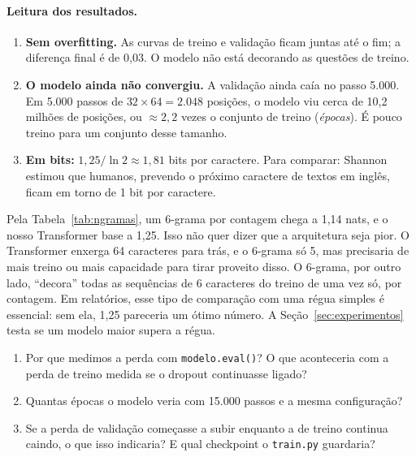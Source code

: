 \documentclass[11pt,a4paper]{article}
\begin{document}
\paragraph{Leitura dos resultados.}
\begin{enumerate}
\item \textbf{Sem overfitting.} As curvas de treino e validação ficam juntas até o fim; a diferença final é de 0,03. O modelo não está decorando as questões de treino.
\item \textbf{O modelo ainda não convergiu.} A validação ainda caía no passo 5.000. Em 5.000 passos de $32\times 64 = 2.048$ posições, o modelo viu cerca de 10,2 milhões de posições, ou $\approx 2{,}2$ vezes o conjunto de treino (\emph{épocas}). É pouco treino para um conjunto desse tamanho.
\item \textbf{Em bits:} $1{,}25/\ln 2 \approx 1{,}81$ bits por caractere. Para comparar: Shannon \cite{shannon1951} estimou que humanos, prevendo o próximo caractere de textos em inglês, ficam em torno de 1 bit por caractere.
\end{enumerate}

\begin{atencao}
Pela Tabela~\ref{tab:ngramas}, um 6-grama por contagem chega a 1,14 nats, e o nosso Transformer base a 1,25. Isso não quer dizer que a arquitetura seja pior. O Transformer enxerga 64 caracteres para trás, e o 6-grama só 5, mas precisaria de mais treino ou mais capacidade para tirar proveito disso. O 6-grama, por outro lado, ``decora'' todas as sequências de 6 caracteres do treino de uma vez só, por contagem. Em relatórios, esse tipo de comparação com uma régua simples é essencial: sem ela, 1,25 pareceria um ótimo número. A Seção~\ref{sec:experimentos} testa se um modelo maior supera a régua.
\end{atencao}

\begin{exercicios}
\begin{enumerate}
\item Por que medimos a perda com \texttt{modelo.eval()}? O que aconteceria com a perda de treino medida se o dropout continuasse ligado?
\item Quantas épocas o modelo veria com 15.000 passos e a mesma configuração?
\item Se a perda de validação começasse a subir enquanto a de treino continua caindo, o que isso indicaria? E qual checkpoint o \texttt{train.py} guardaria?
\end{enumerate}
\end{exercicios}
\end{document}
